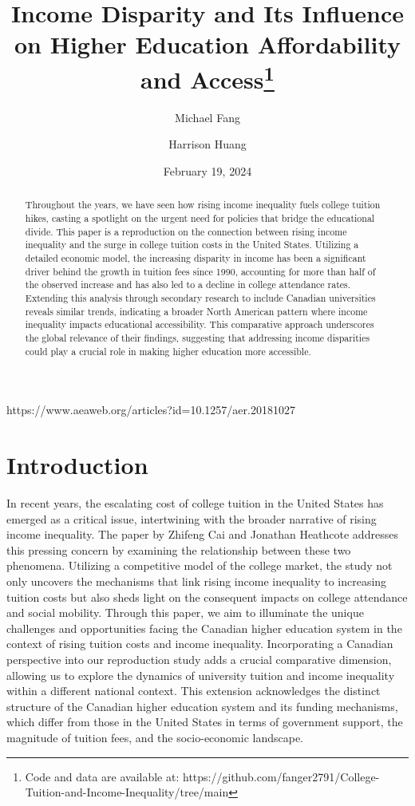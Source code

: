 \documentclass[
  letterpaper,
  DIV=11,
  numbers=noendperiod]{scrartcl}
\title{Income Disparity and Its Influence on Higher Education
Affordability and Access\thanks{Code and data are available at:
https://github.com/fanger2791/College-Tuition-and-Income-Inequality/tree/main}}
\author{Michael Fang \and Harrison Huang}
\date{February 19, 2024}
\begin{document}
\maketitle
\begin{abstract}
Throughout the years, we have seen how rising income inequality fuels
college tuition hikes, casting a spotlight on the urgent need for
policies that bridge the educational divide. This paper is a
reproduction on the connection between rising income inequality and the
surge in college tuition costs in the United States. Utilizing a
detailed economic model, the increasing disparity in income has been a
significant driver behind the growth in tuition fees since 1990,
accounting for more than half of the observed increase and has also led
to a decline in college attendance rates. Extending this analysis
through secondary research to include Canadian universities reveals
similar trends, indicating a broader North American pattern where income
inequality impacts educational accessibility. This comparative approach
underscores the global relevance of their findings, suggesting that
addressing income disparities could play a crucial role in making higher
education more accessible.
\end{abstract}

https://www.aeaweb.org/articles?id=10.1257/aer.20181027

\section{Introduction}\label{introduction}

In recent years, the escalating cost of college tuition in the United
States has emerged as a critical issue, intertwining with the broader
narrative of rising income inequality. The paper by Zhifeng Cai and
Jonathan Heathcote addresses this pressing concern by examining the
relationship between these two phenomena. Utilizing a competitive model
of the college market, the study not only uncovers the mechanisms that
link rising income inequality to increasing tuition costs but also sheds
light on the consequent impacts on college attendance and social
mobility. Through this paper, we aim to illuminate the unique challenges
and opportunities facing the Canadian higher education system in the
context of rising tuition costs and income inequality. Incorporating a
Canadian perspective into our reproduction study adds a crucial
comparative dimension, allowing us to explore the dynamics of university
tuition and income inequality within a different national context. This
extension acknowledges the distinct structure of the Canadian higher
education system and its funding mechanisms, which differ from those in
the United States in terms of government support, the magnitude of
tuition fees, and the socio-economic landscape.
\end{document}
